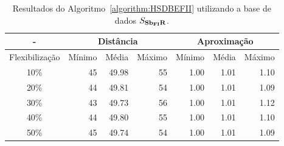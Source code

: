\begin{table}[!htb]
  \caption{Resultados do Algoritmo~\ref{algorithm:HSDBEFII} utilizando a base de dados $S_{\textbf{Sb\textsubscript{FI}R}}{}$.}
  \label{table:MGYFELVA}
  \centering
  \begin{tabular}{|c|r|r|r|r|r|r|}
    \hline
      -            & \multicolumn{3}{c|}{Distância}             & \multicolumn{3}{c|}{Aproximação}           \\ \hline
    Flexibilização & Mínimo       & Média        & Máximo       & Mínimo       & Média        & Máximo       \\ \hline  
    10\%           & 45           & 49.98        & 55           & 1.00         & 1.01         & 1.10         \\ \hline
    20\%           & 44           & 49.81        & 54           & 1.00         & 1.01         & 1.09         \\ \hline
    30\%           & 43           & 49.73        & 56           & 1.00         & 1.01         & 1.12         \\ \hline
    40\%           & 44           & 49.80        & 55           & 1.00         & 1.01         & 1.10         \\ \hline
    50\%           & 45           & 49.74        & 54           & 1.00         & 1.01         & 1.09         \\ \hline    
  \end{tabular}
\end{table}